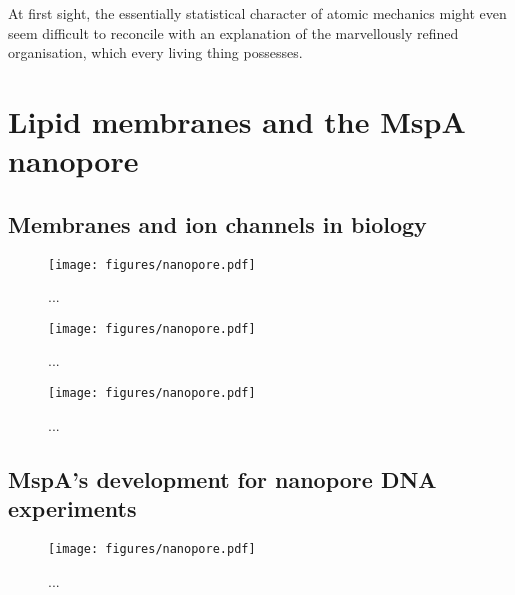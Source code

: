 \begin{savequote}[75mm]
At first sight, the essentially statistical character of atomic mechanics might even seem difficult to reconcile with an explanation of the marvellously refined organisation, which every living thing possesses.
\end{savequote}

\chapter{Lipid membranes and the MspA nanopore}
\label{lipids_mspa}

\section{Membranes and ion channels in biology}

\begin{figure}[h]
\begin{centering}
\texttt{[image: figures/nanopore.pdf]}
\caption[Ion channels in cells]{...}
\label{fig:ion_channels}
\end{centering}
\end{figure}

\begin{figure}[h]
\begin{centering}
\texttt{[image: figures/nanopore.pdf]}
\caption[The protein nanopore MspA]{...}
\label{fig:mspa}
\end{centering}
\end{figure}

\begin{figure}[h]
\begin{centering}
\texttt{[image: figures/nanopore.pdf]}
\caption[Lipids and the lipid bilayer membrane]{...}
\label{fig:lipids}
\end{centering}
\end{figure}

\section{MspA's development for nanopore DNA experiments}

\begin{figure}[h]
\begin{centering}
\texttt{[image: figures/nanopore.pdf]}
\caption[Genetic engineering of MspA]{...}
\label{fig:mspa}
\end{centering}
\end{figure}

